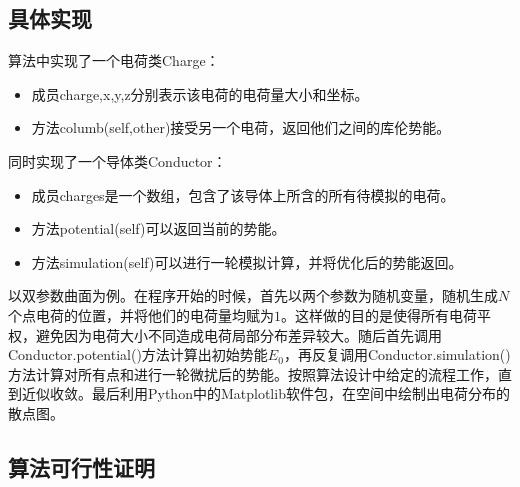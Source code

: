 \documentclass[UTF8]{article}
\numberwithin{figure}{subsection}
\numberwithin{table}{subsection}
\begin{document}
\begin{multicols}{2}
    \subsection{具体实现}
        算法中实现了一个电荷类Charge\cite{lqm}：
        \begin{itemize}
            \item 成员charge,x,y,z分别表示该电荷的电荷量大小和坐标。
            \item 方法columb(self,other)接受另一个电荷，返回他们之间的库伦势能。
        \end{itemize}
        \par 同时实现了一个导体类Conductor：
        \begin{itemize}
            \item 成员charges是一个数组，包含了该导体上所含的所有待模拟的电荷。
            \item 方法potential(self)可以返回当前的势能。
            \item 方法simulation(self)可以进行一轮模拟计算，并将优化后的势能返回。
        \end{itemize}
        \par 以双参数曲面为例。在程序开始的时候，首先以两个参数为随机变量，随机生成$N$个点电荷的位置，并将他们的电荷量均赋为$1$。这样做的目的是使得所有电荷平权，避免因为电荷大小不同造成电荷局部分布差异较大。随后首先调用Conductor.potential()方法计算出初始势能$E_0$，再反复调用Conductor.simulation()方法计算对所有点和进行一轮微扰后的势能。按照算法设计中给定的流程工作，直到近似收敛。最后利用Python中的Matplotlib软件包，在空间中绘制出电荷分布的散点图。

    \subsection{算法可行性证明}

\end{multicols}
\end{document}
